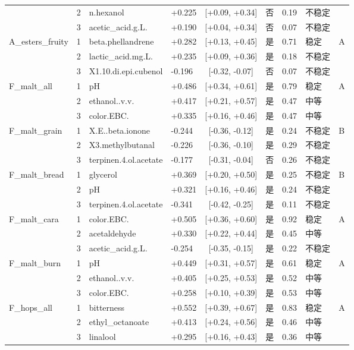 {\begin{longtable}{llllcccll}
 & 2 & n.hexanol & +0.225 & [+0.09, +0.34] & 否 & 0.19 & 不稳定 &  \\
 & 3 & acetic\_acid.g.L. & +0.190 & [+0.04, +0.34] & 否 & 0.07 & 不稳定 &  \\
A\_esters\_fruity & 1 & beta.phellandrene & +0.282 & [+0.13, +0.45] & 是 & 0.71 & 稳定 & A \\
 & 2 & lactic\_acid.mg.L. & +0.235 & [+0.09, +0.36] & 是 & 0.18 & 不稳定 &  \\
 & 3 & X1.10.di.epi.cubenol & -0.196 & [-0.32, -0.07] & 否 & 0.07 & 不稳定 &  \\
F\_malt\_all & 1 & pH & +0.486 & [+0.34, +0.61] & 是 & 0.79 & 稳定 & A \\
 & 2 & ethanol..v.v. & +0.417 & [+0.21, +0.57] & 是 & 0.47 & 中等 &  \\
 & 3 & color.EBC. & +0.335 & [+0.16, +0.46] & 是 & 0.47 & 中等 &  \\
F\_malt\_grain & 1 & X.E..beta.ionone & -0.244 & [-0.36, -0.12] & 是 & 0.24 & 不稳定 & B \\
 & 2 & X3.methylbutanal & -0.226 & [-0.36, -0.10] & 是 & 0.29 & 不稳定 &  \\
 & 3 & terpinen.4.ol.acetate & -0.177 & [-0.31, -0.04] & 否 & 0.26 & 不稳定 &  \\
F\_malt\_bread & 1 & glycerol & +0.369 & [+0.20, +0.50] & 是 & 0.25 & 不稳定 & B \\
 & 2 & pH & +0.321 & [+0.16, +0.46] & 是 & 0.24 & 不稳定 &  \\
 & 3 & terpinen.4.ol.acetate & -0.341 & [-0.42, -0.25] & 是 & 0.11 & 不稳定 &  \\
F\_malt\_cara & 1 & color.EBC. & +0.505 & [+0.36, +0.60] & 是 & 0.92 & 稳定 & A \\
 & 2 & acetaldehyde & +0.330 & [+0.22, +0.44] & 是 & 0.45 & 中等 &  \\
 & 3 & acetic\_acid.g.L. & -0.254 & [-0.35, -0.15] & 是 & 0.22 & 不稳定 &  \\
F\_malt\_burn & 1 & pH & +0.449 & [+0.31, +0.57] & 是 & 0.61 & 稳定 & A \\
 & 2 & ethanol..v.v. & +0.405 & [+0.25, +0.53] & 是 & 0.52 & 中等 &  \\
 & 3 & color.EBC. & +0.258 & [+0.10, +0.39] & 是 & 0.53 & 中等 &  \\
F\_hops\_all & 1 & bitterness & +0.552 & [+0.39, +0.67] & 是 & 0.83 & 稳定 & A \\
 & 2 & ethyl\_octanoate & +0.413 & [+0.24, +0.56] & 是 & 0.46 & 中等 &  \\
 & 3 & linalool & +0.295 & [+0.16, +0.43] & 是 & 0.36 & 中等 &  \\

\end{longtable}}
